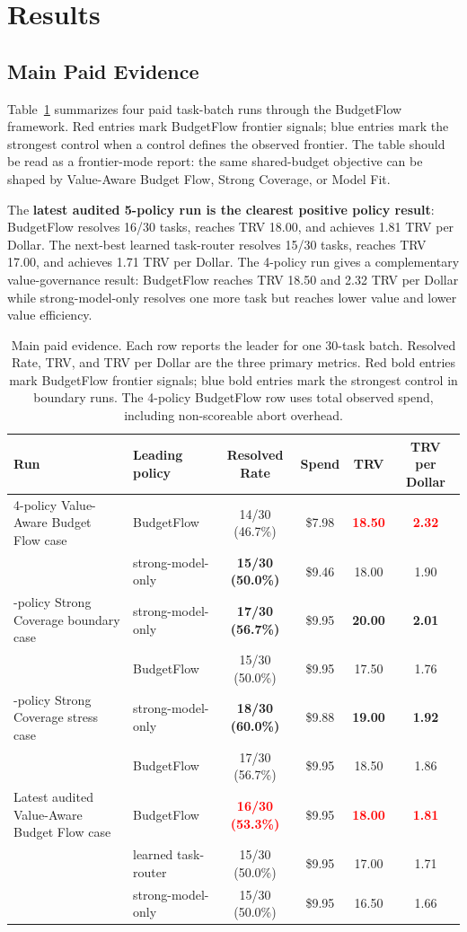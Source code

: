 \documentclass[sigconf,review,anonymous]{acmart}
\newcommand{\method}{BudgetFlow\xspace}
\newcommand{\trv}{TRV\xspace}
\newcommand{\pos}[1]{\textcolor{red}{\textbf{#1}}}
\newcommand{\ctrl}[1]{\textcolor{bfblue}{\textbf{#1}}}
\begin{document}
\section{Results}
\label{sec:results}
\subsection{Main Paid Evidence}
Table~\ref{tab:main-evidence} summarizes four paid task-batch runs through the \method framework. Red entries mark BudgetFlow frontier signals; blue entries mark the strongest control when a control defines the observed frontier. The table should be read as a frontier-mode report: the same shared-budget objective can be shaped by Value-Aware Budget Flow, Strong Coverage, or Model Fit.

The \textbf{latest audited 5-policy run is the clearest positive policy result}: \method resolves 16/30 tasks, reaches \trv 18.00, and achieves 1.81 \trv per Dollar. The next-best learned task-router resolves 15/30 tasks, reaches \trv 17.00, and achieves 1.71 \trv per Dollar. The 4-policy run gives a complementary value-governance result: \method reaches \trv 18.50 and 2.32 \trv per Dollar while strong-model-only resolves one more task but reaches lower value and lower value efficiency.

\begin{table}[t]
\centering
\small
\begin{tabular}{llcccc}
\toprule
Run & Leading policy & Resolved Rate & Spend & TRV & TRV per Dollar \\
\midrule
4-policy Value-Aware Budget Flow case & \method & 14/30 (46.7\%) & \$7.98 & \pos{18.50} & \pos{2.32} \\
 & strong-model-only & \ctrl{15/30 (50.0\%)} & \$9.46 & 18.00 & 1.90 \\
\addlinespace
5-policy Strong Coverage boundary case & strong-model-only & \ctrl{17/30 (56.7\%)} & \$9.95 & \ctrl{20.00} & \ctrl{2.01} \\
 & \method & 15/30 (50.0\%) & \$9.95 & 17.50 & 1.76 \\
\addlinespace
5-policy Strong Coverage stress case & strong-model-only & \ctrl{18/30 (60.0\%)} & \$9.88 & \ctrl{19.00} & \ctrl{1.92} \\
 & \method & 17/30 (56.7\%) & \$9.95 & 18.50 & 1.86 \\
\addlinespace
Latest audited Value-Aware Budget Flow case & \method & \pos{16/30 (53.3\%)} & \$9.95 & \pos{18.00} & \pos{1.81} \\
 & learned task-router & 15/30 (50.0\%) & \$9.95 & 17.00 & 1.71 \\
 & strong-model-only & 15/30 (50.0\%) & \$9.95 & 16.50 & 1.66 \\
\bottomrule
\end{tabular}
\caption{Main paid evidence. Each row reports the leader for one 30-task batch. Resolved Rate, \trv, and \trv per Dollar are the three primary metrics. Red bold entries mark BudgetFlow frontier signals; blue bold entries mark the strongest control in boundary runs. The 4-policy BudgetFlow row uses total observed spend, including non-scoreable abort overhead.}
\label{tab:main-evidence}
\end{table}
\end{document}
